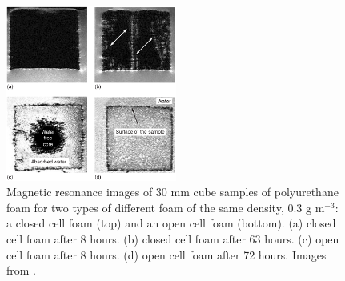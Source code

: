\begin{figure}[!tbhp]
\includegraphics[width=0.5\textwidth]{Figures/NeutronCaptureTime/foam_water_absorption.png}
\centering
\caption{Magnetic resonance images of 30 mm cube samples of polyurethane foam for two types of different foam of the same density, 0.3 g m${}^{-3}$: a closed cell foam (top) and an open cell foam (bottom).
(a) closed cell foam after 8 hours. (b) closed cell foam after 63 hours.
(c) open cell foam after 8 hours. (d) open cell foam after 72 hours.
Images from \cite{foam_mri_data_ref}.
}
\label{fig:foam_mri_water_ingress}
\end{figure}


